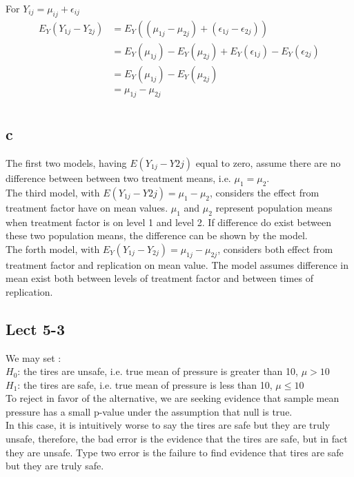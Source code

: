 \documentclass[11pt,letterpaper]{article}
\begin{document}
\noindent For $Y_{ij} = \mu_{ij} + \epsilon_{ij}$
\begin{align*}
E_Y(Y_{1j} - Y_{2j}) &= E_Y((\mu_{1j} - \mu_{2j}) + (\epsilon_{1j} - \epsilon_{2j})) \\
&= E_Y(\mu_{1j}) -E_Y( \mu_{2j}) + E_Y(\epsilon_{1j}) - E_Y(\epsilon_{2j}) \\
&= E_Y(\mu_{1j}) -E_Y( \mu_{2j}) \\
&= \mu_{1j} - \mu_{2j} \\
\end{align*}

\subsection*{c}
The first two models, having $E(Y_{1j} - Y{2j})$ equal to zero, assume there are no difference between between two treatment means, i.e. $\mu_1 = \mu_2$. \\

\noindent The third model, with $E(Y_{1j} - Y{2j}) = \mu_1 - \mu_2$, considers the effect from treatment factor have on mean values. $\mu_1$ and $\mu_2$ represent population means when treatment factor is on level 1 and level 2. If difference do exist between these two population means, the difference can be shown by the model. \\

\noindent The forth model, with $E_Y(Y_{1j} - Y_{2j}) = \mu_{1j} - \mu_{2j}$, considers both effect from treatment factor and replication on mean value. The model assumes difference in mean exist both between levels of treatment factor and between times of replication. 

\subsection*{Lect 5-3}

We may set : \\
$H_0$: the tires are unsafe, i.e. true mean of pressure is greater than 10, $\mu > 10$ \\
$H_1$: the tires are safe, i.e. true mean of pressure is less than 10, $\mu \leq 10$\\

\noindent To reject in favor of the alternative, we are seeking evidence that sample mean pressure has a small p-value under the assumption that null is true. \\

\noindent In this case, it is intuitively worse to say the tires are safe but they are truly unsafe, therefore, the bad error is the evidence that the tires are safe, but in fact they are unsafe. Type two error is the failure to find evidence that tires are safe but they are truly safe. \\
\end{document}
